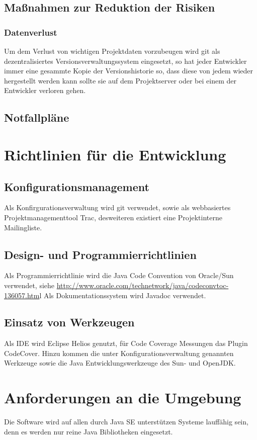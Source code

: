 \documentclass[a4paper,10pt]{scrartcl}
\begin{document}
\subsection{Maßnahmen zur Reduktion der Risiken}
\subsubsection{Datenverlust}
Um dem Verlust von wichtigen Projektdaten vorzubeugen wird git als dezentralisiertes Versionsverwaltungssystem eingesetzt,
so hat jeder Entwickler immer eine gesammte Kopie der Versionshistorie so, dass diese von jedem wieder hergestellt werden kann
sollte sie auf dem Projektserver oder bei einem der Entwickler verloren gehen.
\subsection{Notfallpläne}

\section{Richtlinien für die Entwicklung}
\subsection{Konfigurationsmanagement}
Als Konfirgurationsverwaltung wird git verwendet, sowie als webbasiertes Projektmanagementtool Trac, desweiteren existiert eine Projektinterne
Mailingliste.
\subsection{Design- und Programmierrichtlinien}
Als Programmierrichtlinie wird die Java Code Convention von Oracle/Sun verwendet, siehe \url{http://www.oracle.com/technetwork/java/codeconvtoc-136057.htm}l
Als Dokumentationssystem wird Javadoc verwendet.
\subsection{Einsatz von Werkzeugen}
Als IDE wird Eclipse Helios genutzt, für Code Coverage Messungen das Plugin CodeCover. Hinzu kommen die unter Konfigurationsverwaltung genannten
Werkzeuge sowie die Java Entwicklungswerkzeuge des Sun- und OpenJDK.
\section{Anforderungen an die Umgebung}
Die Software wird auf allen durch Java SE unterstützen Systeme lauffähig sein, denn es werden nur reine Java Bibliotheken eingesetzt.
\end{document}

